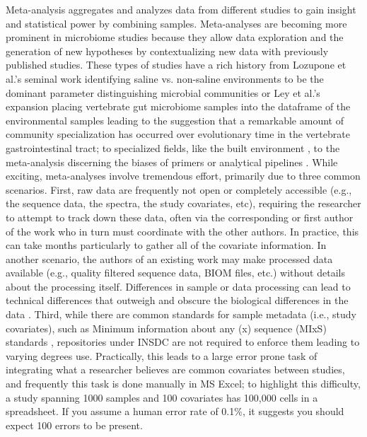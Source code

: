Meta-analysis aggregates and analyzes data from different studies to gain insight
and statistical power by combining samples. Meta-analyses are becoming more
prominent in microbiome studies because they allow data exploration and the
generation of new hypotheses by contextualizing new data with previously published
studies. These types of studies have a rich history from Lozupone et al.’s seminal
work identifying saline vs. non-saline environments to be the dominant parameter
distinguishing microbial communities \cite{Lozupone2007} or Ley et al.’s \cite{Ley2008Worlds}
expansion placing vertebrate gut microbiome samples into the dataframe of the
environmental samples leading to the suggestion that a remarkable amount of community
specialization has occurred over evolutionary time in the vertebrate gastrointestinal tract;
to specialized fields, like the built environment \cite{Adams2015}, to the meta-analysis
discerning the biases of primers or analytical pipelines \cite{Debelius2016, Lozupone2013}.
While exciting, meta-analyses involve tremendous effort, primarily due to three common
scenarios. First, raw data are frequently not open or completely accessible (e.g., the
sequence data, the spectra, the study covariates, etc), requiring the researcher to
attempt to track down these data, often via the corresponding or first author of the
work who in turn must coordinate with the other authors. In practice, this can take
months particularly to gather all of the covariate information. In another scenario,
the authors of an existing work may make processed data available (e.g., quality
filtered sequence data, BIOM files, etc.) without details about the processing itself.
Differences in sample or data processing can lead to technical differences that outweigh
and obscure the biological differences in the data \cite{Debelius2016}. Third, while
there are common standards for sample metadata (i.e., study covariates), such as Minimum
information about any (x) sequence (MIxS) standards \cite{Yilmaz2011}, repositories under
INSDC are not required to enforce them leading to varying degrees use. Practically, this
leads to a large error prone task of integrating what a researcher believes are common
covariates between studies, and frequently this task is done manually in MS Excel; to
highlight this difficulty, a study spanning 1000 samples and 100 covariates has 100,000
cells in a spreadsheet. If you assume a human error rate of 0.1\%, it suggests you should
expect 100 errors to be present.


